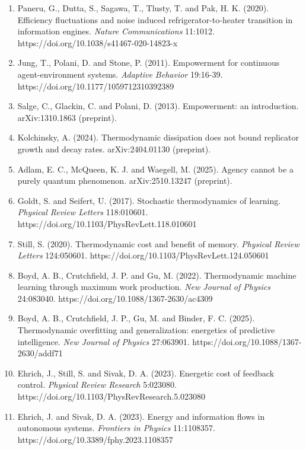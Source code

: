 \documentclass[
  10pt,
]{article}
\begin{document}
\begin{enumerate}
  power-efficiency tradeoff in a micro heat engine by engineered
  system-bath interactions. \emph{Nature Communications} 14:6842.
  https://doi.org/10.1038/s41467-023-42350-y
\item
  Paneru, G., Dutta, S., Sagawa, T., Tlusty, T. and Pak, H. K. (2020).
  Efficiency fluctuations and noise induced refrigerator-to-heater
  transition in information engines. \emph{Nature Communications}
  11:1012. https://doi.org/10.1038/s41467-020-14823-x
\item
  Jung, T., Polani, D. and Stone, P. (2011). Empowerment for continuous
  agent-environment systems. \emph{Adaptive Behavior} 19:16-39.
  https://doi.org/10.1177/1059712310392389
\item
  Salge, C., Glackin, C. and Polani, D. (2013). Empowerment: an
  introduction. arXiv:1310.1863 (preprint).
\item
  Kolchinsky, A. (2024). Thermodynamic dissipation does not bound
  replicator growth and decay rates. arXiv:2404.01130 (preprint).
\item
  Adlam, E. C., McQueen, K. J. and Waegell, M. (2025). Agency cannot be
  a purely quantum phenomenon. arXiv:2510.13247 (preprint).
\item
  Goldt, S. and Seifert, U. (2017). Stochastic thermodynamics of
  learning. \emph{Physical Review Letters} 118:010601.
  https://doi.org/10.1103/PhysRevLett.118.010601
\item
  Still, S. (2020). Thermodynamic cost and benefit of memory.
  \emph{Physical Review Letters} 124:050601.
  https://doi.org/10.1103/PhysRevLett.124.050601
\item
  Boyd, A. B., Crutchfield, J. P. and Gu, M. (2022). Thermodynamic
  machine learning through maximum work production. \emph{New Journal of
  Physics} 24:083040. https://doi.org/10.1088/1367-2630/ac4309
\item
  Boyd, A. B., Crutchfield, J. P., Gu, M. and Binder, F. C. (2025).
  Thermodynamic overfitting and generalization: energetics of predictive
  intelligence. \emph{New Journal of Physics} 27:063901.
  https://doi.org/10.1088/1367-2630/addf71
\item
  Ehrich, J., Still, S. and Sivak, D. A. (2023). Energetic cost of
  feedback control. \emph{Physical Review Research} 5:023080.
  https://doi.org/10.1103/PhysRevResearch.5.023080
\item
  Ehrich, J. and Sivak, D. A. (2023). Energy and information flows in
  autonomous systems. \emph{Frontiers in Physics} 11:1108357.
  https://doi.org/10.3389/fphy.2023.1108357

\end{enumerate}
\end{document}
